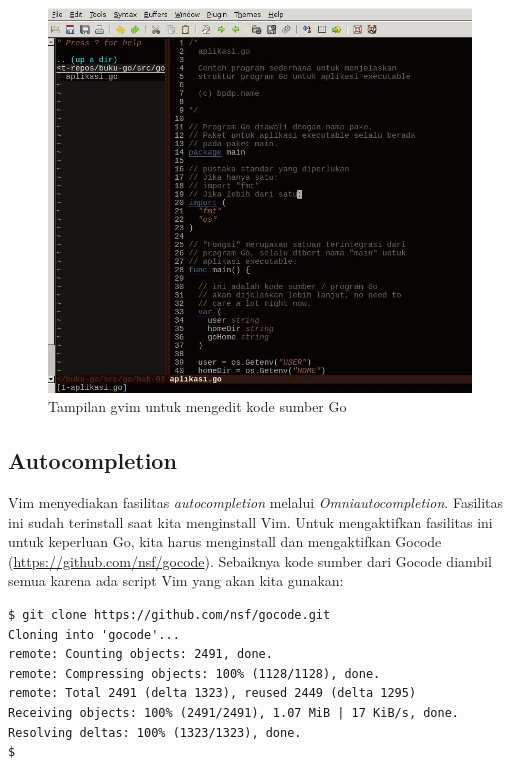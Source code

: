   \begin{figure}
    \begin{center}
      \includegraphics[scale=0.5]{images/vim-go.jpg}
    \end{center}
    \caption{Tampilan gvim untuk mengedit kode sumber Go}
    \label{fig:vim-go}
  \end{figure}


\subsection{Autocompletion}

Vim menyediakan fasilitas \textit{autocompletion} melalui \textit{Omniautocompletion}. Fasilitas ini sudah terinstall saat kita menginstall Vim. Untuk mengaktifkan fasilitas ini untuk keperluan Go, kita harus menginstall dan mengaktifkan Gocode (\url{https://github.com/nsf/gocode}). Sebaiknya kode sumber dari Gocode diambil semua karena ada script Vim yang akan kita gunakan:

\begin{mdframed}[style=catatan]
\begin{verbatim}
$ git clone https://github.com/nsf/gocode.git
Cloning into 'gocode'...
remote: Counting objects: 2491, done.
remote: Compressing objects: 100% (1128/1128), done.
remote: Total 2491 (delta 1323), reused 2449 (delta 1295)
Receiving objects: 100% (2491/2491), 1.07 MiB | 17 KiB/s, done.
Resolving deltas: 100% (1323/1323), done.
$
\end{verbatim}
\end{mdframed}

